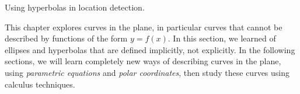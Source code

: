 \begin{lxfigure}
\caption{Using hyperbolas in location detection.}%
\label{fig:hyperbola_locate}
\end{lxfigure}

This chapter explores curves in the plane, in particular curves that cannot be described by functions of the form $y=f(x)$. In this section, we learned of ellipses and hyperbolas that are defined implicitly, not explicitly. In the following sections, we will learn completely new ways of describing curves in the plane, using \emph{parametric equations} and \emph{polar coordinates}, then study these curves using calculus techniques.

